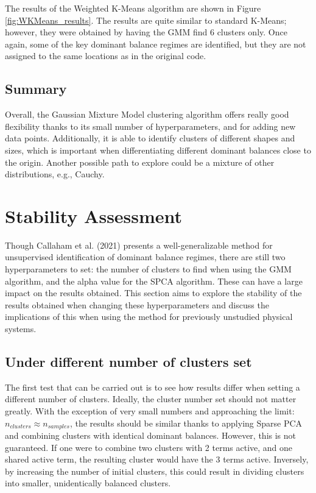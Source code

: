 \documentclass[12pt]{report} %
\begin{document}
The results of the Weighted K-Means algorithm are shown in Figure \ref{fig:WKMeans_results}. The results are quite similar to standard K-Means; however, they were obtained by having the GMM find 6 clusters only. Once again, some of the key dominant balance regimes are identified, but they are not assigned to the same locations as in the original code.

\subsection{Summary}

Overall, the Gaussian Mixture Model clustering algorithm offers really good flexibility thanks to its small number of hyperparameters, and for adding new data points. Additionally, it is able to identify clusters of different shapes and sizes, which is important when differentiating different dominant balances close to the origin. Another possible path to explore could be a mixture of other distributions, e.g., Cauchy.

\section{Stability Assessment}

Though Callaham et al. (2021)\cite{callaham2021learning} presents a well-generalizable method for unsupervised identification of dominant balance regimes, there are still two hyperparameters to set: the number of clusters to find when using the GMM algorithm, and the alpha value for the SPCA algorithm. These can have a large impact on the results obtained. This section aims to explore the stability of the results obtained when changing these hyperparameters and discuss the implications of this when using the method for previously unstudied physical systems.

\subsection{Under different number of clusters set}

The first test that can be carried out is to see how results differ when setting a different number of clusters. Ideally, the cluster number set should not matter greatly. With the exception of very small numbers and approaching the limit: $n_{clusters} \approx n_{samples}$,  the results should be similar thanks to applying Sparse PCA and combining clusters with identical dominant balances. However, this is not guaranteed. If one were to combine two clusters with 2 terms active, and one shared active term, the resulting cluster would have the 3 terms active. Inversely, by increasing the number of initial clusters, this could result in dividing clusters into smaller, unidentically balanced clusters.
\end{document}
